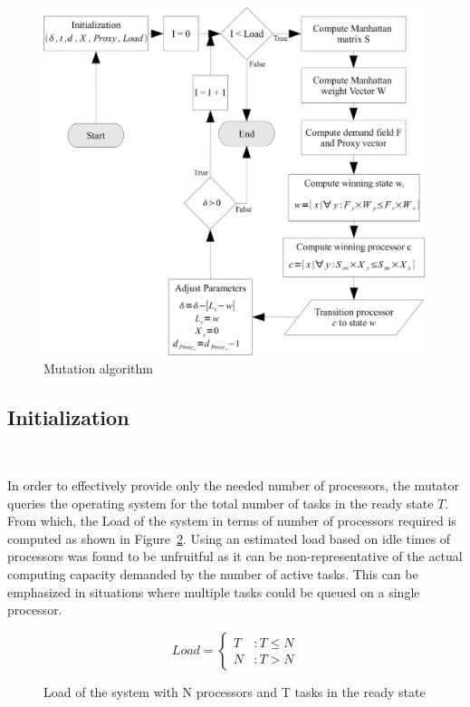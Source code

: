 \begin{figure}[h!]
  \begin{center}
    \includegraphics[height=4in]{figures/Mutation_algo.jpg}%
    \caption{Mutation algorithm}
    \label{fig:mutation_algo}
  \end{center}
\end{figure}

\subsection{Initialization}~\label{sec:mut_init}

In order to effectively provide only the needed number of processors, the mutator
queries the operating system for the total number of tasks in the ready state $T$. 
From which, the Load of the system in terms of number of processors required is computed 
as shown in Figure~\ref{fig:projected_load}. Using an estimated load based on idle times
of processors was found to be unfruitful as it can be non-representative of the actual 
computing capacity demanded by the number of active tasks. This can be emphasized in situations where multiple
tasks could be queued on a single processor.

\begin{figure}[h!]
\centering
\begin{equation*}
    Load = \left\{
     \begin{array}{lr}
       T & : T \leq N\\
       N & : T > N
     \end{array}
   \right.
\end{equation*}
\caption{Load of the system with N processors and T tasks in the ready state}
\label{fig:projected_load}
\end{figure}

